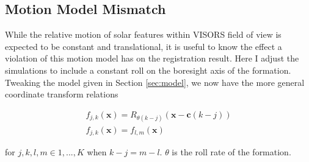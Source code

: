 \documentclass[tocnosub,noragright,centerchapter,12pt]{uiucecethesis09}
\begin{document}
\subsection{Motion Model Mismatch}

While the relative motion of solar features within VISORS field of view is expected to be constant and translational, it is useful to know the effect a violation of this motion model has on the registration result.  Here I adjust the simulations to include a constant roll on the boresight axis of the formation.  Tweaking the model given in Section \ref{sec:model}, we now have the more general coordinate transform relations

\begin{eqnarray}
  f_{j,k}(\bm{x}) = R_{\theta (k - j)}\left(\bm{x} - \bm{c}(k - j)\right) \\
  f_{j,k}(\bm{x}) = f_{l,m}(\bm{x})
  \label{eqn:constant}
\end{eqnarray}

for $j,k,l,m \in 1, ..., K$ when $k - j = m - l$.  $\theta$ is the roll rate of the formation.
\end{document}
